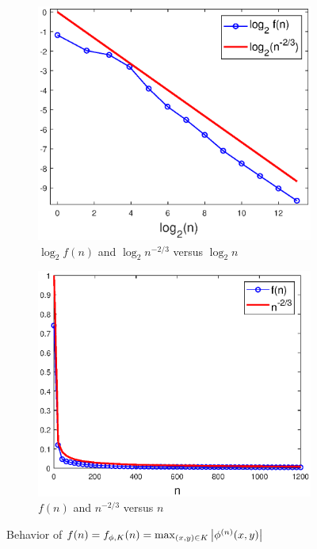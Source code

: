 \documentclass[smallextended]{svjour3}
\theoremstyle{remark}
\begin{document}
\begin{example}
\begin{figure}[!htb]
    \begin{subfigure}{0.49\textwidth}
    \centering
    \includegraphics[scale=0.4]{Fig9a.eps}
    \caption{$\log_2 f(n)$ and $\log_2 n^{-2/3}$ versus $\log_2 n$}
    \end{subfigure}
    \begin{subfigure}{0.49\textwidth}
    \centering
    \includegraphics[scale=0.4]{Fig9b.eps}
    \caption{$f(n)$ and $n^{-2/3}$ versus $n$}
    \end{subfigure}
    \caption{Behavior of $f(n)=f_{\phi,K}(n)=\max_{(x,y)\in K}\abs{\phi^{(n)}(x,y)}$}
    \label{fig:Conv_Pwr_5}
\end{figure}



\end{example}
\end{document}
